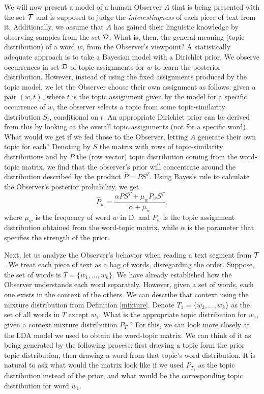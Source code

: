 \documentclass{article} %
\begin{document}
We will now present a model of a human Observer $A$ that is being presented with
the set ${\mathcal T}$ and is supposed to judge the {\em interestingness} of
each piece of text from it. Additionally, we assume that $A$ has
gained their linguistic knowledge by observing samples from the set
${\mathcal D}$. What is, then, the general meaning (topic distribution) of a word $w$,
from the Observer's viewpoint? A statistically adequate approach is to
take a Bayesian model with a Dirichlet prior. We observe occurrences
in set ${\mathcal D}$ of topic assignments for $w$ to learn the posterior
distribution. However, instead of using the fixed assignments produced
by the topic model, we let the Observer choose their own assignment as
follows: given a pair $(w,t)$, where $t$ is the topic assignment given
by the model for a specific occurrence of $w$, the observer selects a
topic from some topic-similarity distribution $S_t$, conditional on
$t$. An appropriate Dirichlet prior can be derived from this by
looking at the overall topic assignments (not for a specific
word). What would we get if we fed those to the Observer, letting $A$
generate their own topic for each?  Denoting by $S$ the matrix with
rows of topic-similarity distributions and by $P$ the (row vector) topic
distribution coming from the word-topic matrix, we find that the
observer's prior will concentrate around the distribution described by
the product $\widehat{P}=PS^T$. Using Bayes's rule to calculate the Observer's
posterior probability, we get
\[\widehat{P}_w=\frac{\alpha PS^T + \mu_w P_wS^T}{\alpha+\mu_w},\]
where $\mu_w$ is the frequency of word $w$ in D, and $P_w$ is the
topic assignment distribution obtained from the word-topic matrix,
while $\alpha$ is the parameter that specifies the strength of the
prior.

Next, let us analyze the Observer's behavior when reading a text
segment from ${\mathcal T}$. We treat each piece of text as a bag of words,
disregarding the order. Suppose, the set of words is $T=\{w_1,...,w_k\}$. We
have already established how the Observer understands each word
separately. However, given a set of words, each one exists in the
context of the others. We can describe that context using the mixture
distribution from Definition \ref{mixture}. Denote
$T_1=\{w_2,...,w_k\}$ as the set of all words in $T$ except
$w_1$. What is the appropriate topic distribution for $w_1$, given a
context mixture distribution $P_{T_1}$? For this, we can look more
closely at the LDA model we used to obtain the word-topic matrix. We
can think of it as being generated by the following process: first
drawing a topic form the prior topic distribution, then drawing a word
from that topic's word distribution. It is natural to ask what would
the matrix look like if we used $P_{T_1}$ as the topic distribution
instead of the prior, and what would be the corresponding topic
distribution for word $w_1$. 
\end{document}
